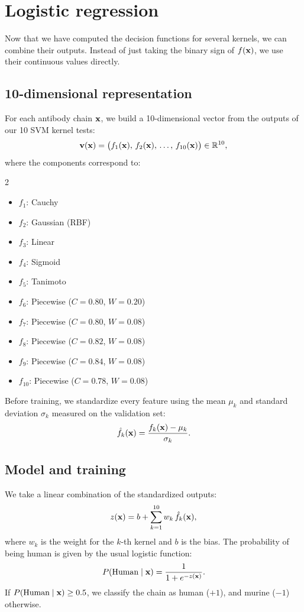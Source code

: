\newpage
\section{Logistic regression}

Now that we have computed the decision functions for several kernels, we can combine their outputs. Instead of just taking the binary sign of $f(\textbf x)$, we use their continuous values directly.

\subsection{10-dimensional representation}

For each antibody chain $\textbf x$, we build a 10-dimensional vector from the outputs of our 10 SVM kernel tests:
$$
\textbf v(\textbf x) = \bigl(f_1(\textbf x),\, f_2(\textbf x),\, \dots,\, f_{10}(\textbf x)\bigr) \in \mathbb R^{10},
$$
where the components correspond to:
\begin{multicols}{2}
\begin{itemize}
    \item $f_1$: Cauchy
    \item $f_2$: Gaussian (RBF)
    \item $f_3$: Linear
    \item $f_4$: Sigmoid
    \item $f_5$: Tanimoto
    \item $f_6$: Piecewise ($C=0.80$, $W=0.20$)
    \item $f_7$: Piecewise ($C=0.80$, $W=0.08$)
    \item $f_8$: Piecewise ($C=0.82$, $W=0.08$)
    \item $f_9$: Piecewise ($C=0.84$, $W=0.08$)
    \item $f_{10}$: Piecewise ($C=0.78$, $W=0.08$)
\end{itemize}
\end{multicols}

Before training, we standardize every feature using the mean $\mu_k$ and standard deviation $\sigma_k$ measured on the validation set:
$$
\hat f_k(\textbf x) = \frac{f_k(\textbf x) - \mu_k}{\sigma_k}.
$$

\subsection{Model and training}

We take a linear combination of the standardized outputs:
$$
z(\textbf x) = b + \sum_{k=1}^{10} w_k\, \hat f_k(\textbf x),
$$
where $w_k$ is the weight for the $k$-th kernel and $b$ is the bias. The probability of being human is given by the usual logistic function:
$$
P(\text{Human} \mid \textbf x) = \frac{1}{1 + e^{-z(\textbf x)}}.
$$
If $P(\text{Human} \mid \textbf x) \ge 0.5$, we classify the chain as human ($+1$), and murine ($-1$) otherwise.

